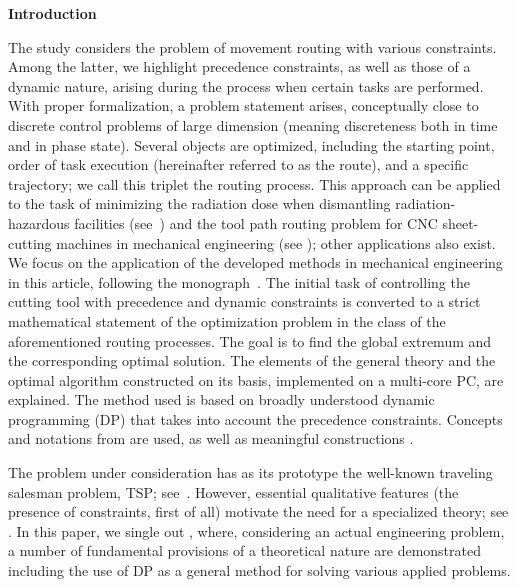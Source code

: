 \titleeng
\annotationandkeywordseng

\begin{flushleft}
  {\bf{Introduction}}
\end{flushleft}

The study considers the problem of movement routing
with various constraints.
Among the latter, we highlight
precedence constraints,
as well as those of a dynamic nature,
arising during the process when certain tasks are performed.
With proper formalization, a problem statement arises,
conceptually close to discrete control problems of large dimension
(meaning discreteness both in time and in phase state).
Several objects are optimized,
including the starting point,
order of task execution
(hereinafter referred to as the route),
and a specific trajectory;
we call this triplet
the routing process.
This approach can be applied
to the task of minimizing the radiation dose
when dismantling radiation-hazardous facilities
(see~\cite {1,3})
and the tool path routing problem
for CNC sheet-cutting machines
in mechanical engineering (see \cite {4,5});
other applications also exist.
We focus on the application of the developed methods in mechanical engineering
in this article,
following the monograph~\cite{4}.
The initial task of controlling the cutting tool
with precedence and dynamic constraints
is converted to a strict mathematical statement of
the optimization problem
in the class of the aforementioned routing processes.
The goal is to find
the global extremum and the corresponding optimal solution.
The elements of the general theory and
the optimal algorithm constructed on its basis,
implemented on a multi-core PC,
are explained.
The method used is based on
broadly understood dynamic programming
(DP)
that takes into account the precedence constraints.
Concepts and notations from
\cite[part II]{4}
are used,
as well as
meaningful constructions
\cite[part I]{4}.

The problem under consideration
has as its prototype the well-known
traveling salesman problem,
TSP;
see~\cite{7,8,9,10,11,12}.
However, essential qualitative features
(the presence of constraints, first of all)
motivate the need for a specialized theory;
see \cite {1,3,4,5,14}.
In this paper,
we single out \cite{4},
where, considering an actual engineering problem,
a number of fundamental provisions of a theoretical nature
are demonstrated including the use of DP
as a general method for solving various applied problems.

